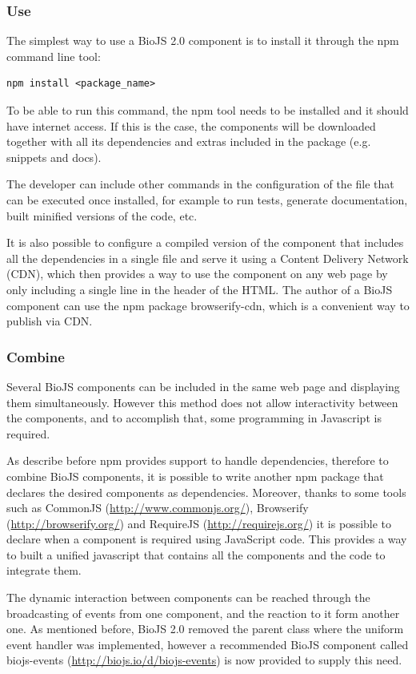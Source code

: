 \subsubsection{Use}
The simplest way to use a BioJS 2.0 component is to install it through the npm command line tool:
\begin{lstlisting}
npm install <package_name>
\end{lstlisting}

To be able to run this command, the npm tool needs to be installed and it should have internet access. If this is the case, the components will be downloaded together with all its dependencies and extras included in the package (e.g. snippets and docs). 

The developer can include other commands in the configuration of the file that can be executed once installed, for example to run tests, generate documentation, built minified versions of the code, etc.

It is also possible to configure a compiled version of the component that includes all the dependencies in a single file and serve it using a Content Delivery Network (CDN), which then provides a way to use the component on any web page by only including a single line in the header of the HTML. The author of a BioJS component can use the npm package browserify-cdn, which is a convenient way to publish via CDN.

\subsubsection{Combine}
Several BioJS components can be included in the same web page and displaying them simultaneously. However this method does not allow interactivity between the components, and to accomplish that, some programming in Javascript is required.
 
As describe before npm provides support to handle dependencies, therefore to combine BioJS components, it is possible to write another npm package that declares the desired components as dependencies. Moreover, thanks to some tools such as CommonJS (\url{http://www.commonjs.org/}), Browserify (\url{http://browserify.org/}) and RequireJS (\url{http://requirejs.org/}) it is possible to declare when a component is required using JavaScript code. This provides a way to built a unified javascript that contains all the components and the code to integrate them.

The dynamic interaction between components can be reached through the broadcasting of events from one component, and the reaction to it form another one. As mentioned before, BioJS 2.0 removed the parent class where the uniform event handler was implemented, however a recommended BioJS component called biojs-events (\url{http://biojs.io/d/biojs-events}) is now provided to supply this need.

